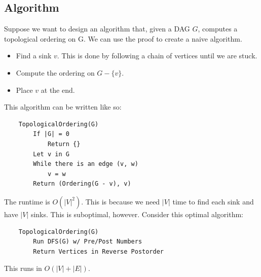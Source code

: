 \documentclass[letterpaper]{article}
\begin{document}
\subsection{Algorithm}
Suppose we want to design an algorithm that, given a DAG $G$, computes a topological ordering on G. We can use the proof to create a naive algorithm. 
\begin{itemize}
    \item Find a sink $v$. This is done by following a chain of vertices until we are stuck.
    \item Compute the ordering on $G - \{v\}$.
    \item Place $v$ at the end. 
\end{itemize}
This algorithm can be written like so: 
\begin{verbatim}
    TopologicalOrdering(G)
        If |G| = 0
            Return {}
        Let v in G 
        While there is an edge (v, w)
            v = w
        Return (Ordering(G - v), v)
\end{verbatim}
The runtime is $O(|V|^2)$. This is because we need $|V|$ time to find each sink and have $|V|$ sinks. This is suboptimal, however. Consider this optimal algorithm:
\begin{verbatim}
    TopologicalOrdering(G)
        Run DFS(G) w/ Pre/Post Numbers 
        Return Vertices in Reverse Postorder
\end{verbatim}
This runs in $O(|V| + |E|)$.
\end{document}
